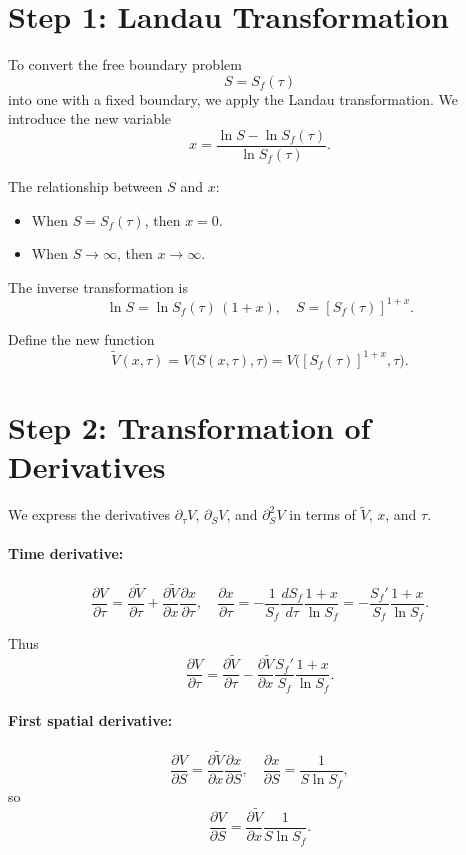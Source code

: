 \documentclass{article}
\begin{document}
\section*{Step 1: Landau Transformation}
To convert the free boundary problem
\[S = S_f(\tau)\]
into one with a fixed boundary, we apply the Landau transformation. We introduce the new variable
\[x = \frac{\ln S - \ln S_f(\tau)}{\ln S_f(\tau)}.
\]

The relationship between \(S\) and \(x\):
\begin{itemize}
  \item When \(S = S_f(\tau)\), then \(x = 0.\)
  \item When \(S \to \infty\), then \(x \to \infty.\)
\end{itemize}

The inverse transformation is
\[
\ln S = \ln S_f(\tau)\,(1 + x),
\quad
S = [S_f(\tau)]^{1 + x}.
\]

Define the new function
\[
\tilde V(x,\tau) = V\bigl(S(x,\tau),\tau\bigr)
= V\bigl([S_f(\tau)]^{1 + x}, \tau\bigr).
\]

\section*{Step 2: Transformation of Derivatives}
We express the derivatives
\(\partial_\tau V\), \(\partial_S V\), and \(\partial^2_S V\)
in terms of \(\tilde V\), \(x\), and \(\tau\).

\paragraph{Time derivative:}
\[
\frac{\partial V}{\partial \tau}
= \frac{\partial \tilde V}{\partial \tau}
+ \frac{\partial \tilde V}{\partial x}\frac{\partial x}{\partial \tau},
\quad
\frac{\partial x}{\partial \tau}
= -\frac{1}{S_f}\frac{dS_f}{d\tau}\frac{1 + x}{\ln S_f}
= -\frac{S_f'}{S_f}\frac{1 + x}{\ln S_f}.
\]

Thus
\[
\frac{\partial V}{\partial \tau}
= \frac{\partial \tilde V}{\partial \tau}
- \frac{\partial \tilde V}{\partial x}\frac{S_f'}{S_f}\frac{1 + x}{\ln S_f}.
\]

\paragraph{First spatial derivative:}
\[
\frac{\partial V}{\partial S}
= \frac{\partial \tilde V}{\partial x}\frac{\partial x}{\partial S},
\quad
\frac{\partial x}{\partial S} = \frac{1}{S \ln S_f},
\]
so
\[
\frac{\partial V}{\partial S}
= \frac{\partial \tilde V}{\partial x}\frac{1}{S \ln S_f}.
\]
\end{document}
